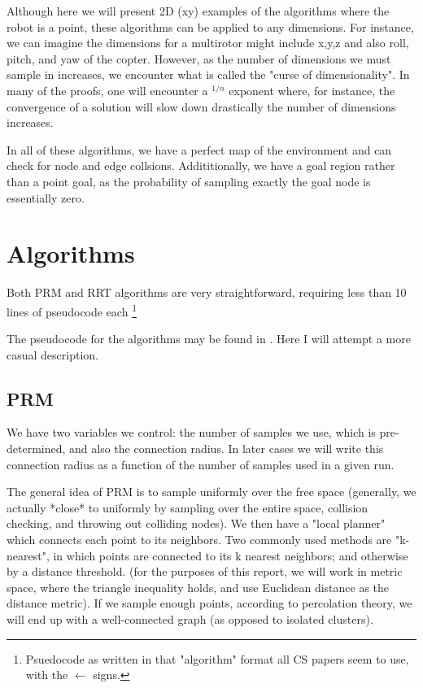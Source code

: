 \documentclass[a4paper]{article}
\begin{document}
Although here we will present 2D (xy) examples of the algorithms where the robot
is a point, these algorithms can be applied to any dimensions. For instance, we
can imagine the dimensions for a multirotor might include x,y,z and also roll,
pitch, and yaw of the copter. However, as the number of dimensions we must sample in
increases, we encounter what is called the "curse of dimensionality". In many of
the proofs, one will encounter a $^{1/n}$ exponent where, for instance, the
convergence of a solution will slow down drastically the number of dimensions
increases.

In all of these algorithms, we have a perfect map of the environment and can
check for node and edge collsions. Addititionally, we have a goal region rather
than a point goal, as the probability of sampling exactly the goal node is
essentially zero.

\section{Algorithms}

Both PRM and RRT algorithms are very straightforward, requiring less than 10
lines of pseudocode each \footnote{Psuedocode as written in that "algorithm"
format all CS papers seem to use, with the $\gets$ signs.} 

The pseudocode for the algorithms may be found in \cite{RRT*}. Here I will
attempt a more casual description. 


\subsection{PRM}

We have two variables we control: the number of samples we use, which is
pre-determined, and also the connection radius. In later cases we will write
this connection radius as a function of the number of samples used in a
given run. 

The general idea of PRM is to sample uniformly over the free space (generally,
we actually *close* to uniformly by sampling over the entire space, collision
checking, and throwing out colliding nodes). We then have a "local planner"
which connects each point to its neighbors. Two commonly used methods are
"k-nearest", in which points are connected to its k nearest neighbors; and
otherwise by a distance threshold. (for the purposes of this report, we will
work in metric space, where the triangle inequality holds, and use Euclidean
distance as the distance metric). If we sample enough points, according to percolation
theory, we will end up with a well-connected graph (as opposed to isolated
clusters).
\end{document}
